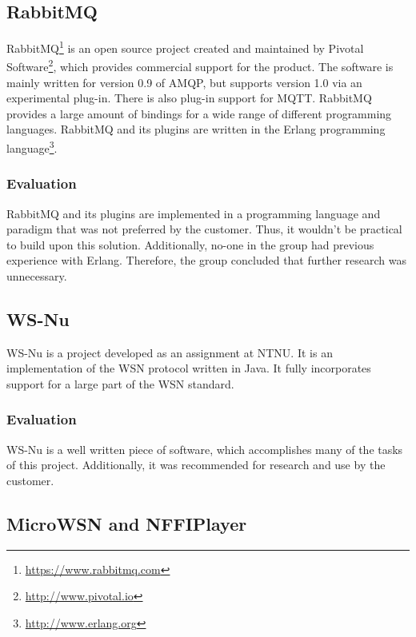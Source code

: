 \subsection{RabbitMQ}
\label{subsec:prestudies-existing_solutions-rabbitmq}

RabbitMQ\footnote{\url{https://www.rabbitmq.com}} is an open source project created and maintained by Pivotal Software\footnote{\url{http://www.pivotal.io}}, which provides commercial support for the product. The software is mainly written for version 0.9 of AMQP, but supports version 1.0 via an experimental plug-in. There is also plug-in support for MQTT. RabbitMQ provides a large amount of bindings for a wide range of different programming languages. RabbitMQ and its plugins are written in the Erlang programming language\footnote{\url{http://www.erlang.org}}.

\subsubsection{Evaluation}
\label{subsec:prestudies-existing_solutions-rabbitmq-evaluation}

RabbitMQ and its plugins are implemented in a programming language and paradigm that was not preferred by the customer. Thus, it wouldn't be practical to build upon this solution. Additionally, no-one in the group had previous experience with Erlang. Therefore, the group concluded that further research was unnecessary.

\subsection{WS-Nu}
\label{subsec:prestudies-existing_solutions-ws_nu}

WS-Nu is a project developed as an assignment at NTNU. It is an implementation of the WSN protocol written in Java. It fully incorporates support for a large part of the WSN standard.

\subsubsection{Evaluation}
\label{subsec:prestudies-existing_solution-ws_nu-evaluation}

WS-Nu is a well written piece of software, which accomplishes many of the tasks of this project. Additionally, it was recommended for research and use by the customer.

\subsection{MicroWSN and NFFIPlayer}
\label{subsec:prestudies-existing_solutions-micro_wsn_and_nffiplayer}

